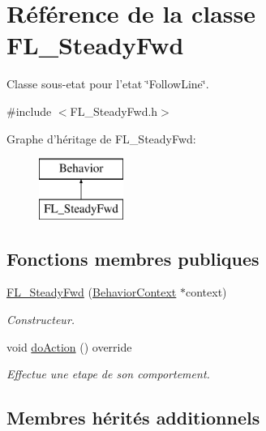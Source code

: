 \hypertarget{class_f_l___steady_fwd}{\section{Référence de la classe F\-L\-\_\-\-Steady\-Fwd}
\label{class_f_l___steady_fwd}
}


Classe sous-\/etat pour l'etat \char`\"{}\-Follow\-Line\char`\"{}.  




{\ttfamily \#include $<$F\-L\-\_\-\-Steady\-Fwd.\-h$>$}

Graphe d'héritage de F\-L\-\_\-\-Steady\-Fwd\-:\begin{figure}[H]
\begin{center}
\leavevmode
\includegraphics[height=2.000000cm]{class_f_l___steady_fwd}
\end{center}
\end{figure}
\subsection*{Fonctions membres publiques}
{\bf }\par
\begin{DoxyCompactItemize}
\item 
\hyperlink{class_f_l___steady_fwd_aa59ef9cea5b095213ce577971f0613c6}{F\-L\-\_\-\-Steady\-Fwd} (\hyperlink{class_behavior_context}{Behavior\-Context} $\ast$context)
\begin{DoxyCompactList}\small\item\em Constructeur. \end{DoxyCompactList}\item 
void \hyperlink{class_f_l___steady_fwd_a2d1b5496599302e15a292a2547b3226e}{do\-Action} () override
\begin{DoxyCompactList}\small\item\em Effectue une etape de son comportement. \end{DoxyCompactList}\end{DoxyCompactItemize}

\subsection*{Membres hérités additionnels}


